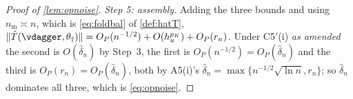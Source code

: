 \begin{proof}[Proof of \cref{lem:opnoise}]
\emph{Step 5: assembly.} Adding the three bounds and using $n_{\mathrm m}\asymp n$, which is
\eqref{eq:foldbal} of \cref{def:hatT},
$\|\hat T(\vdagger,\theta_\dagger)\|=O_P(n^{-1/2})+O(h_u^{p_K})+O_P(r_n)$. Under C5$'$(i) \emph{as amended}
the second is $O(\hat\delta_n)$ by Step~3, the first is $O_P(n^{-1/2})=O_P(\hat\delta_n)$ and the third is
$O_P(r_n)=O_P(\hat\delta_n)$, both by A5(i)'s $\hat\delta_n=\max\{n^{-1/2}\sqrt{\ln n},r_n\}$; so
$\hat\delta_n$ dominates all three, which is
\eqref{eq:opnoise}.
\end{proof}


